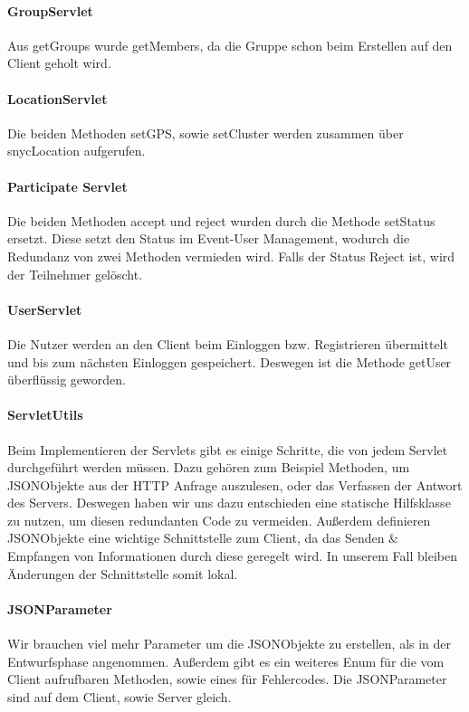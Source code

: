 \documentclass{scrartcl}
\begin{document}
	\paragraph{GroupServlet}
	Aus getGroups wurde getMembers, da die Gruppe schon beim Erstellen auf den Client geholt wird. 	%
	
	\paragraph{LocationServlet}
	Die beiden Methoden setGPS, sowie setCluster werden zusammen über snycLocation aufgerufen. %
	
	\paragraph{Participate Servlet}
	Die beiden Methoden accept und reject wurden durch die Methode setStatus ersetzt. Diese setzt den Status im Event-User Management, wodurch die Redundanz von zwei Methoden vermieden wird. Falls der Status Reject ist, wird der Teilnehmer gelöscht. 
	
	\paragraph{UserServlet}
	Die Nutzer werden an den Client beim Einloggen bzw. Registrieren übermittelt und bis zum nächsten Einloggen gespeichert. Deswegen ist die Methode getUser überflüssig geworden.
	
	\paragraph{ServletUtils}
	Beim Implementieren der Servlets gibt es einige Schritte, die von jedem Servlet durchgeführt werden müssen. Dazu gehören zum Beispiel Methoden, um JSONObjekte aus der HTTP Anfrage auszulesen, oder das Verfassen der Antwort des Servers.
	Deswegen haben wir uns dazu entschieden eine statische Hilfsklasse zu nutzen, um diesen redundanten Code zu vermeiden. Außerdem definieren JSONObjekte eine wichtige Schnittstelle zum Client, da das Senden \& Empfangen von Informationen durch diese geregelt wird. In unserem Fall bleiben Änderungen der Schnittstelle somit lokal.
	
	\paragraph{JSONParameter}
	Wir brauchen viel mehr Parameter um die JSONObjekte zu erstellen, als in der Entwurfsphase angenommen. Außerdem gibt es ein weiteres Enum für die vom Client aufrufbaren Methoden, sowie eines für Fehlercodes. Die JSONParameter sind auf dem Client, sowie Server gleich. 
		
\end{document}
